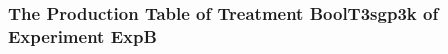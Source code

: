  \begin{frame}
 \fontsize{8pt}{9pt}\selectfont
 \frametitle{ The Production Table of Treatment BoolT3sgp3k of Experiment ExpB }

 \label{ExpBGrammarTable019.tex}  
 \end{frame}

